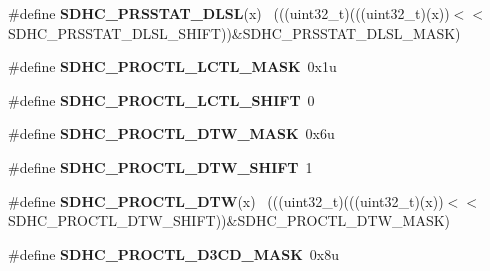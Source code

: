 \begin{DoxyCompactItemize}
\item 
\hypertarget{group___s_d_h_c___register___masks_ga942a5be77bd4140272cb30a4b36686f8}{}\#define {\bfseries S\+D\+H\+C\+\_\+\+P\+R\+S\+S\+T\+A\+T\+\_\+\+D\+L\+S\+L}(x)                                      ~(((uint32\+\_\+t)(((uint32\+\_\+t)(x))$<$$<$S\+D\+H\+C\+\_\+\+P\+R\+S\+S\+T\+A\+T\+\_\+\+D\+L\+S\+L\+\_\+\+S\+H\+I\+F\+T))\&S\+D\+H\+C\+\_\+\+P\+R\+S\+S\+T\+A\+T\+\_\+\+D\+L\+S\+L\+\_\+\+M\+A\+S\+K)\label{group___s_d_h_c___register___masks_ga942a5be77bd4140272cb30a4b36686f8}

\item 
\hypertarget{group___s_d_h_c___register___masks_ga482b0e558b7376a5e14f47bffdcb33c1}{}\#define {\bfseries S\+D\+H\+C\+\_\+\+P\+R\+O\+C\+T\+L\+\_\+\+L\+C\+T\+L\+\_\+\+M\+A\+S\+K}~0x1u\label{group___s_d_h_c___register___masks_ga482b0e558b7376a5e14f47bffdcb33c1}

\item 
\hypertarget{group___s_d_h_c___register___masks_ga754a95dd49bc69dbc62ae443f1c12d16}{}\#define {\bfseries S\+D\+H\+C\+\_\+\+P\+R\+O\+C\+T\+L\+\_\+\+L\+C\+T\+L\+\_\+\+S\+H\+I\+F\+T}~0\label{group___s_d_h_c___register___masks_ga754a95dd49bc69dbc62ae443f1c12d16}

\item 
\hypertarget{group___s_d_h_c___register___masks_gabd8aa52532f5ddcfe86bbd56dd467aaa}{}\#define {\bfseries S\+D\+H\+C\+\_\+\+P\+R\+O\+C\+T\+L\+\_\+\+D\+T\+W\+\_\+\+M\+A\+S\+K}~0x6u\label{group___s_d_h_c___register___masks_gabd8aa52532f5ddcfe86bbd56dd467aaa}

\item 
\hypertarget{group___s_d_h_c___register___masks_ga7738f58de3f0c8a3c55fdf494fa9b7a5}{}\#define {\bfseries S\+D\+H\+C\+\_\+\+P\+R\+O\+C\+T\+L\+\_\+\+D\+T\+W\+\_\+\+S\+H\+I\+F\+T}~1\label{group___s_d_h_c___register___masks_ga7738f58de3f0c8a3c55fdf494fa9b7a5}

\item 
\hypertarget{group___s_d_h_c___register___masks_gaecbb85d934f063d60ebf735df37b9936}{}\#define {\bfseries S\+D\+H\+C\+\_\+\+P\+R\+O\+C\+T\+L\+\_\+\+D\+T\+W}(x)                                          ~(((uint32\+\_\+t)(((uint32\+\_\+t)(x))$<$$<$S\+D\+H\+C\+\_\+\+P\+R\+O\+C\+T\+L\+\_\+\+D\+T\+W\+\_\+\+S\+H\+I\+F\+T))\&S\+D\+H\+C\+\_\+\+P\+R\+O\+C\+T\+L\+\_\+\+D\+T\+W\+\_\+\+M\+A\+S\+K)\label{group___s_d_h_c___register___masks_gaecbb85d934f063d60ebf735df37b9936}

\item 
\hypertarget{group___s_d_h_c___register___masks_ga597b9ab57f2ad515508d8b2e8b3832c7}{}\#define {\bfseries S\+D\+H\+C\+\_\+\+P\+R\+O\+C\+T\+L\+\_\+\+D3\+C\+D\+\_\+\+M\+A\+S\+K}~0x8u\label{group___s_d_h_c___register___masks_ga597b9ab57f2ad515508d8b2e8b3832c7}


\end{DoxyCompactItemize}
